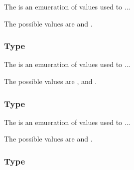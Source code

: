 The  is an emueration of values used to ...

The possible values are  and .

\subsubsection{Type \fixttspace{}}



The  is an emueration of values used to ...

The possible values are ,  and
.

\subsubsection{Type \fixttspace{}}



The  is an emueration of values used to ...

The possible values are  and .

\subsubsection{Type \fixttspace{}}



